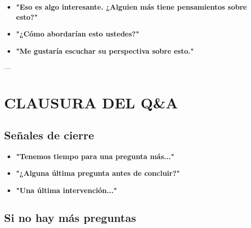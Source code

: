 \documentclass[a4paper,11pt]{article}
\begin{document}
\begin{itemize}

  \item \textbf{"Eso es algo interesante. ¿Alguien más tiene pensamientos sobre esto?"}

  \item \textbf{"¿Cómo abordarían esto ustedes?"}

  \item \textbf{"Me gustaría escuchar su perspectiva sobre esto."}

\end{itemize}

\vspace{0.2cm}

---

\vspace{0.2cm}

\section{CLAUSURA DEL Q&A}

\vspace{0.2cm}

\subsection{Señales de cierre}

\begin{itemize}

  \item \textbf{"Tenemos tiempo para una pregunta más..."}

  \item \textbf{"¿Alguna última pregunta antes de concluir?"}

  \item \textbf{"Una última intervención..."}

\end{itemize}

\vspace{0.2cm}

\subsection{Si no hay más preguntas}
\end{document}
